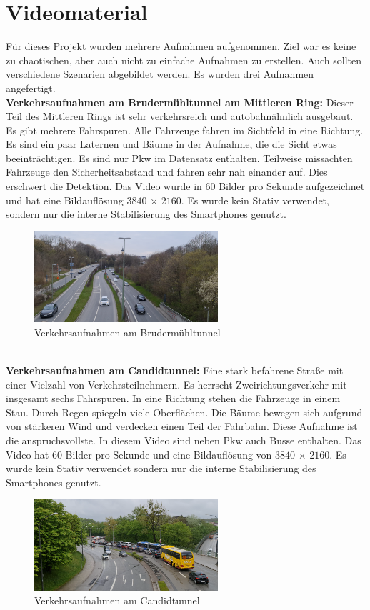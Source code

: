 \documentclass[conference]{IEEEtran}
\begin{document}
	\section{Videomaterial}
	Für dieses Projekt wurden mehrere Aufnahmen aufgenommen. Ziel war es keine zu chaotischen, aber auch nicht zu einfache Aufnahmen zu erstellen. Auch sollten verschiedene Szenarien abgebildet werden. Es wurden drei Aufnahmen angefertigt.\\
	\textbf{Verkehrsaufnahmen am Brudermühltunnel am Mittleren Ring:}
	Dieser Teil des Mittleren Rings ist sehr verkehrsreich und autobahnähnlich ausgebaut. Es gibt mehrere Fahrspuren. Alle Fahrzeuge fahren im Sichtfeld in eine Richtung. Es sind ein paar Laternen und Bäume in der Aufnahme, die die Sicht etwas beeinträchtigen. Es sind nur Pkw im Datensatz enthalten. Teilweise missachten Fahrzeuge den Sicherheitsabstand und fahren sehr nah einander auf. Dies erschwert die Detektion. Das Video wurde in 60 Bilder pro Sekunde aufgezeichnet und hat eine Bildauflösung $3840$ × $2160$. Es wurde kein Stativ verwendet, sondern nur die interne Stabilisierung des Smartphones genutzt.
	\begin{figure}[!h]
		\begin{center}
			\includegraphics[width=6.8cm]{Media/BrudermuhlRaw.png}
			\caption{Verkehrsaufnahmen am Brudermühltunnel}
			\label{BrudermuhlRaw}
		\end{center}
	\end{figure}\\
	\textbf{Verkehrsaufnahmen am Candidtunnel:}
	Eine stark befahrene Straße mit einer Vielzahl von Verkehrsteilnehmern. Es herrscht Zweirichtungsverkehr mit insgesamt sechs Fahrspuren. In eine Richtung stehen die Fahrzeuge in einem Stau. Durch Regen spiegeln viele Oberflächen. Die Bäume bewegen sich aufgrund von stärkeren Wind und verdecken einen Teil der Fahrbahn. Diese Aufnahme ist die anspruchsvollste. In diesem Video sind neben Pkw auch Busse enthalten. Das Video hat 60 Bilder pro Sekunde und eine Bildauflösung von $3840$ × $2160$. Es wurde kein Stativ verwendet sondern nur die interne Stabilisierung des Smartphones genutzt.
	\begin{figure}[!h]
		\begin{center}
			\includegraphics[width=6.8cm]{Media/CandidRaw.png}
			\caption{Verkehrsaufnahmen am Candidtunnel}
			\label{CandidtunnelRaw}
		\end{center}
	\end{figure}\\
\end{document}
